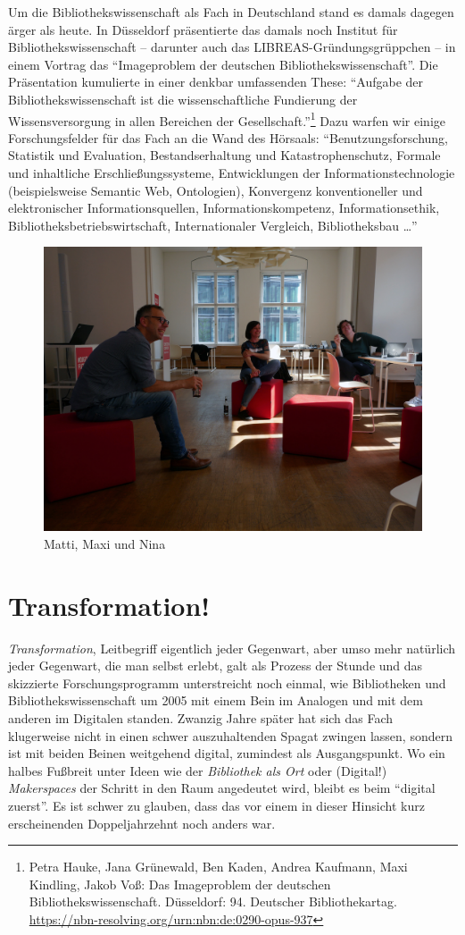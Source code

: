 \documentclass[a4paper,
fontsize=11pt,
oneside,
numbers=noperiodatend,
parskip=half-,
bibliography=totoc,
final
]{scrartcl}
\begin{document}
Um die Bibliothekswissenschaft als Fach in Deutschland stand es damals
dagegen ärger als heute. In Düsseldorf präsentierte das damals noch
Institut für Bibliothekswissenschaft -- darunter auch das
LIBREAS-Gründungsgrüppchen -- in einem Vortrag das \enquote{Imageproblem
der deutschen Bibliothekswissenschaft}. Die Präsentation kumulierte in
einer denkbar umfassenden These: \enquote{Aufgabe der
Bibliothekswissenschaft ist die wissenschaftliche Fundierung der
Wissensversorgung in allen Bereichen der Gesellschaft.}\footnote{Petra
  Hauke, Jana Grünewald, Ben Kaden, Andrea Kaufmann, Maxi Kindling,
  Jakob Voß: Das Imageproblem der deutschen Bibliothekswissenschaft.
  Düsseldorf: 94. Deutscher Bibliothekartag.
  \url{https://nbn-resolving.org/urn:nbn:de:0290-opus-937}} Dazu warfen
wir einige Forschungsfelder für das Fach an die Wand des Hörsaals:
\enquote{Benutzungsforschung, Statistik und Evaluation,
Bestandserhaltung und Katastrophenschutz, Formale und inhaltliche
Erschließungssysteme, Entwicklungen der Informationstechnologie
(beispielsweise Semantic Web, Ontologien), Konvergenz konventioneller
und elektronischer Informationsquellen, Informationskompetenz,
Informationsethik, Bibliotheksbetriebswirtschaft, Internationaler
Vergleich, Bibliotheksbau \ldots{}}

\begin{figure}[H]
\centering
\includegraphics[width=.7\textwidth]{img/Abb1.jpg}
\caption{Matti, Maxi und Nina}
\end{figure}

\section{Transformation!}\label{transformation}

\emph{Transformation}, Leitbegriff eigentlich jeder Gegenwart, aber umso
mehr natürlich jeder Gegenwart, die man selbst erlebt, galt als Prozess
der Stunde und das skizzierte Forschungsprogramm unterstreicht noch
einmal, wie Bibliotheken und Bibliothekswissenschaft um 2005 mit einem
Bein im Analogen und mit dem anderen im Digitalen standen. Zwanzig Jahre
später hat sich das Fach klugerweise nicht in einen schwer
auszuhaltenden Spagat zwingen lassen, sondern ist mit beiden Beinen
weitgehend digital, zumindest als Ausgangspunkt. Wo ein halbes Fußbreit
unter Ideen wie der \emph{Bibliothek als Ort} oder (Digital!)
\emph{Makerspaces} der Schritt in den Raum angedeutet wird, bleibt es
beim \enquote{digital zuerst}. Es ist schwer zu glauben, dass das vor
einem in dieser Hinsicht kurz erscheinenden Doppeljahrzehnt noch anders
war.
\end{document}
